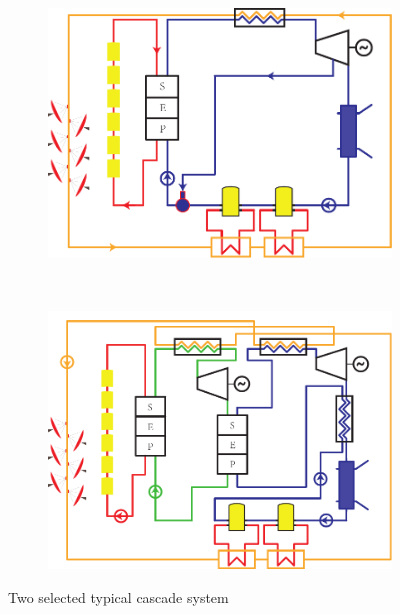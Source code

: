 \noindent \begin{figure}[htbp]
\centering
	\begin{subfigure}[b]{0.4\columnwidth}
	\includegraphics[width = \columnwidth]{fig/CascadeSystem1}
	\caption{}\label{fig:CascadeSystem1}
	\end{subfigure}
	~
\begin{subfigure}[b]{0.4\columnwidth}
	\includegraphics[width = \columnwidth]{fig/CascadeSystem2}
	\caption{}\label{fig:CascadeSystem2}
	\end{subfigure}
	\caption{Two selected typical cascade system}
	\label{fig:CascadeSystems}
\end{figure}

